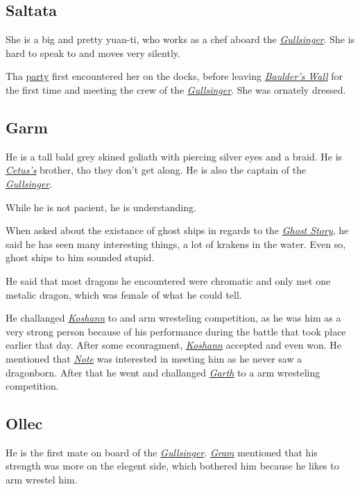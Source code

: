 \documentclass{article}
\begin{document}
\begin{multicols}{2}
    \subsection{Saltata}
    \label{Saltata}

    She is a big and pretty yuan-ti, who works as a chef aboard the \hyperref[gullsinger]{\textit{Gullsinger}}. She is hard to speak to and moves very silently.

    Tha \hyperref[party]{party} first encountered her  on the docks, before leaving \hyperref[baulders_wall]{\textit{Baulder's Wall}} for the first time and meeting the crew of the
    \hyperref[gullsinger]{\textit{Gullsinger}}. She was ornately dressed.

    \subsection{Garm}
    \label{garm}

    He is a tall bald grey skined goliath with piercing silver eyes and a braid. He is \hyperref[cetus]{\textit{Cetus's}} brother, tho they don't get along. He is also the captain of the
    \hyperref[gullsinger]{\textit{Gullsinger}}.

    While he is not pacient, he is understanding.

    When asked about the existance of ghost ships in regards to the \hyperref[gohl]{\textit{Ghost Story}}, he said he has seen many interesting things, a lot of krakens in the water. Even so, ghost ships to him sounded
    stupid.

    He said that most dragons he encountered were chromatic and only met one metalic dragon, which was female of what he could tell.

    He challanged \hyperref[koshann]{\textit{Koshann}} to and arm wresteling competition, as he was him as a very strong person because of his performance during the battle that took place earlier that day. After some
    ecouragment, \hyperref[koshann]{\textit{Koshann}} accepted and even won. He mentioned that \hyperref[note]{\textit{Note}} was interested in meeting him as he never saw a dragonborn. After that he went and challanged
    \hyperref[garth_trea]{\textit{Garth}} to a arm wresteling competition.

    \subsection{Ollec}
    \label{ollec}

    He is the first mate on board of the \hyperref[gullsinger]{\textit{Gullsinger}}. \hyperref[garm]{\textit{Gram}} mentioned that his strength was more on the elegent side, which bothered him because he likes to arm
    wrestel him.


\end{multicols}
\end{document}
